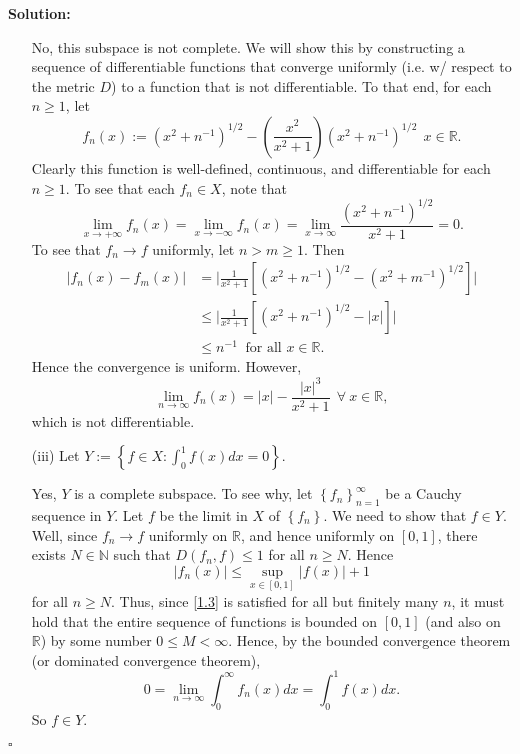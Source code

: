 \documentclass[12pt]{article}
\newcounter{ProofCounter}
\newenvironment{Solution}{\stepcounter{ProofCounter}\textbf{Solution:}}{\hfill$\square$}
\begin{document}
\begin{Solution}
\begin{enumerate}
      No, this subspace is not complete. We will show this by constructing a sequence of differentiable functions that converge uniformly (i.e. w/
      respect to the metric $D$) to a
      function that is not differentiable. To that end, for each $n \geq 1$, let 
      \[
        f_{n}(x) := (x^{2} + n^{-1})^{1/2} - \left( \frac{x^2}{x^2 + 1} \right)\left( x^{2} + n^{-1} \right)^{1/2} \ \ x \in \mathbb{R}.
      \]
      Clearly this function is well-defined, continuous, and differentiable for each $n \geq 1$. To see that each $f_{n} \in X$, note that 
      \[
        \lim_{x\rightarrow+\infty}f_{n}(x) = \lim_{x\rightarrow -\infty}f_{n}(x) = \lim_{x\rightarrow\infty} \frac{(x^2 + n^{-1})^{1/2}}{x^2+1} = 0.
      \]
      To see that $f_{n} \rightarrow f$ uniformly, let $n > m \geq 1$. Then 
      \begin{align*}
        |f_{n}(x) - f_{m}(x)| & = \bigg| \frac{1}{x^2 + 1}\left[ (x^2 + n^{-1})^{1/2} - (x^{2} + m^{-1})^{1/2} \right]\bigg| \\
        & \leq \bigg| \frac{1}{x^2 + 1}\left[ (x^2 + n^{-1})^{1/2} - |x| \right]\bigg| \\
        & \leq n^{-1} \ \text{ for all } x \in \mathbb{R}.
      \end{align*}
      Hence the convergence is uniform.
      However,
      \[
        \lim_{n\rightarrow \infty}f_{n}(x) = |x| - \frac{|x|^3}{x^2 + 1} \ \ \forall \ x\in \mathbb{R},
      \]
      which is not differentiable.

    \item[(iii)] Let $Y := \left\{ f \in X : \int_{0}^{1}f(x)dx = 0 \right\}$.

      Yes, $Y$ is a complete subspace. To see why, let $\left\{ f_{n} \right\}_{n=1}^{\infty}$ be a Cauchy sequence in $Y$. Let $f$ be the limit in
      $X$ of $\left\{ f_{n} \right\}$. We need to show that $f \in Y$. Well, since $f_n \rightarrow f$ uniformly on $\mathbb{R}$, and hence uniformly
      on $[0,1]$, there exists $N \in \mathbb{N}$ such that $D(f_n, f) \leq 1$ for all $n \geq N$. Hence 
      \begin{equation}
        |f_{n}(x)| \leq \sup_{x\in[0,1]}|f(x)| + 1
        \label{1.3}
      \end{equation}
      for all $n \geq N$. Thus, since \eqref{1.3} is satisfied for all but finitely many $n$, it must hold that the entire sequence of functions is
      bounded on $[0,1]$ (and also on $\mathbb{R}$) by some number $0 \leq M < \infty$. Hence, by the bounded convergence theorem (or dominated
      convergence theorem),
      \[
        0 = \lim_{n\rightarrow\infty}\int_{0}^{\infty}f_{n}(x)dx = \int_{0}^{1}f(x)dx.
      \]
      So $f \in Y$.
  \end{enumerate}
\end{Solution}
\end{document}
